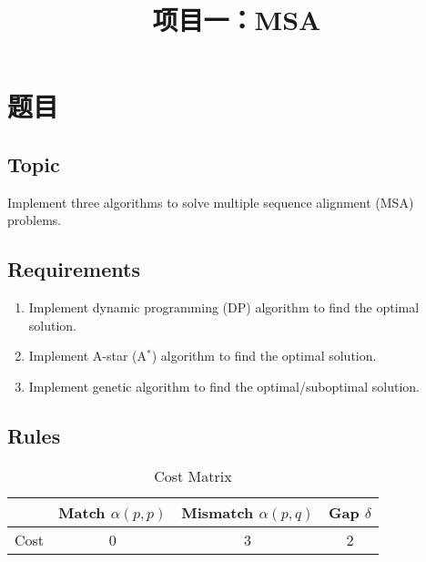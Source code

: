 \endofdump
{}

    \title{项目一：MSA}
    \maketitle

    \tableofcontents
    \clearpage

    \section{题目}

    \subsection{Topic}

    Implement three algorithms to solve multiple sequence alignment (MSA) problems.

    \subsection{Requirements}

    \begin{enumerate}
        \item Implement dynamic programming (DP) algorithm to find the optimal solution.
        \item Implement A-star (A$^\ast$) algorithm to find the optimal solution.
        \item Implement genetic algorithm to find the optimal/suboptimal solution.
    \end{enumerate}

    \subsection{Rules}

    \begin{table}[H]
        \centering
        \caption{Cost Matrix}\label{tab:costmat}
        \begin{tabular}{cccc}
            \toprule
                & Match $\alpha(p,p)$ & Mismatch $\alpha(p,q)$ & Gap $\delta$ \\
            \midrule
            Cost & 0 & 3 & 2 \\
            \bottomrule
        \end{tabular}
    \end{table}

